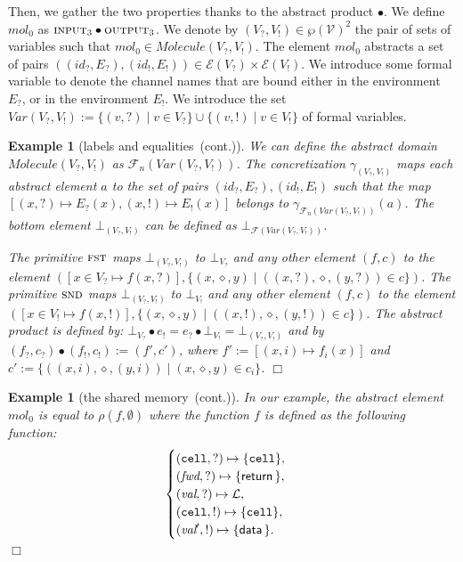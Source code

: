 \documentclass{article}
\newcommand{\bydef}{:=}
\newcommand{\boxexample}{$\Box$}
\newtheorem{example}[thm]{Example}
\newcommand{\Names}{\mathcal{V}}
\newcommand{\Labels}{\mathcal{L}}
\newcommand{\rec}{?}
\newcommand{\eme}{!}
\newcommand{\internal}[1]{\textnormal{\texttt{#1}}}
\newcommand{\data}[1]{\textsf{#1}\,}
\newcommand{\variable}[1]{\textit{#1}}
\newcommand{\cdata}{\data{data}}
\newcommand{\addread}{\data{return}}
\newcommand{\port}{\variable{fwd}}
\newcommand{\ccell}{\internal{cell}}
\newcommand{\datawrite}{\variable{val}'}
\newcommand{\dataread}{\variable{val}}
\newcommand{\flowdom}[1]{\mathcal{F}(#1)}
\newcommand{\flowbot}[1]{\bot_{\flowdom{#1}}}
\newcommand{\normalflowdom}[1]{\mathcal{F}_{n}(#1)}
\newcommand{\normalflowconc}[1]{\gamma_{\normalflowdom{#1}}}
\newcommand{\env}[1]{\mathcal{E}(#1)}
\newcommand{\Erec}{E_{\rec}}
\newcommand{\Eeme}{E_{\eme}}
\newcommand{\Vrec}{V_{\rec}}
\newcommand{\Veme}{V_{\eme}}
\newcommand{\continued}{(cont.)}
\newcommand{\Atomeshortkey}{}
\newcommand{\Moleculekey}{\textit{Molecule}}
\newcommand{\Moleculeshortkey}{}
\newcommand{\Molecule}[2]{\Moleculekey(#1,#2)}
\newcommand{\botatome}[1]{\bot^{\Atomeshortkey}_{#1}}
\newcommand{\gammamolecule}[2]{\gamma^{\Moleculeshortkey}_{({#1},{#2})}}
\newcommand{\botmolecule}[2]{\bot^{\Moleculeshortkey}_{\scriptscriptstyle ({\scriptscriptstyle #1},{\scriptscriptstyle #2})}}
\newcommand{\concat}{\bullet}
\newcommand{\fst}{\textsc{fst}}
\newcommand{\snd}{\textsc{snd}}
\newcommand{\cfadomain}{labels and equalities}
\newcommand{\ccfadomain}{\cfadomain\ \continued}
\newcommand{\shareanalysis}{the shared memory}
\newcommand{\cflowanalysis}{\shareanalysis\ \continued}
\begin{document}
Then, we gather the two properties thanks to the abstract product $\concat$. 
We define $\textit{mol}_0$ as $\textsc{input}_3\concat \textsc{output}_3$. 
We denote by $(\Vrec,\Veme)\in\wp(\Names)^2$ the pair of sets of variables such that $\textit{mol}_0 \in\Molecule{\Vrec}{\Veme}$. The element $\textit{mol}_0$ abstracts a set of pairs $((\textit{id}_\rec,\Erec),(\textit{id}_\eme,\Eeme))\in \env{\Vrec}\times \env{\Veme}$. We introduce some formal variable to denote the channel names that are bound  either in the environment $\Erec$, or in the environment $\Eeme$. We introduce the set $\textit{Var}(\Vrec,\Veme)\bydef\{(v,?)\;|\;v\in \Vrec\}\cup \{(v,!)\;|\;v\in \Veme\}$ of formal variables. 

\begin{example}[\ccfadomain]
We can define the abstract domain $\Molecule{\Vrec}{\Veme}$ as $\normalflowdom{\textit{Var}(\Vrec,\Veme)}$. 
The concretization $\gammamolecule{\Vrec}{\Veme}$ maps each abstract element $a$ to the set of pairs $(\textit{id}_\rec,\Erec),(\textit{id}_\eme,\Eeme)$ such that the map $[(x,\rec)\mapsto \Erec(x),(x,\eme)\mapsto \Eeme(x)]$ belongs to $\normalflowconc{\textit{Var}(\Vrec,\Veme)}(a)$. 
The bottom element $\botmolecule{\Vrec}{\Veme}$ can be defined as $\flowbot{\textit{Var}(\Vrec,\Veme)}$.

The primitive $\fst$ maps 
$\botmolecule{\Vrec}{\Veme}$ to $\botatome{\Vrec}$ and any other element $(f,c)$ to the element $([x\in\Vrec\mapsto f(x,\rec)],\{(x,\diamond,y)\;|\;((x,\rec),\diamond,(y,\rec))\in c\})$. 
The primitive $\snd$  maps $\botmolecule{\Vrec}{\Veme}$ to $\botatome{\Veme}$
 and any  other element $(f,c)$ to the element $([x\in\Veme\mapsto f(x,\eme)],\{(x,\diamond,y)\;|\;((x,\eme),\diamond,(y,\eme))\in c\})$. 
The abstract product is defined by: 
$\botatome{\Vrec}\concat e_\eme = e_\rec \concat \botatome{\Veme} = \botmolecule{\Vrec}{\Veme}$ and by 
$(f_\rec,c_\rec) \concat (f_\eme,c_\eme) \bydef (f',c')$, where $f'\bydef[(x,i) \mapsto f_i(x)]$ and $c'\bydef\{((x,i),\diamond,(y,i))\;|\;(x,\diamond,y)\in c_i\}$.
\boxexample\end{example}



\begin{example}[\cflowanalysis]
In our example, the abstract element $\textit{mol}_0$ is equal to $\rho(f,\emptyset)$ where the function  $f$ is defined as the following function:
\begin{equation*}
\begin{cases}
(\ccell,\rec)  \mapsto \{\ccell\},\cr 
(\port,\rec) \mapsto\{\addread\},\cr
(\dataread,\rec) \mapsto \Labels,\cr
(\ccell,\eme) \mapsto \{\ccell\},\cr
(\datawrite,\eme) \mapsto \{\cdata\}.\cr
\end{cases}
\end{equation*}
\boxexample\end{example}
\end{document}
